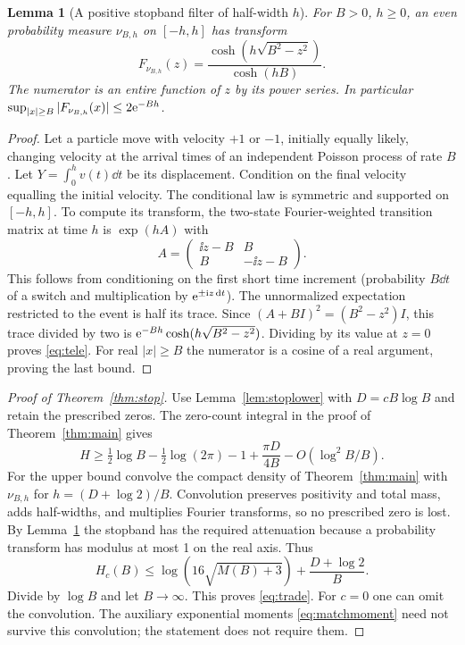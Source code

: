 \documentclass[11pt]{article}
\newtheorem{lemma}[theorem]{Lemma}
\theoremstyle{remark}\newtheorem{remark}[theorem]{Remark}
\begin{document}
\begin{lemma}[A positive stopband filter of half-width $h$]\label{lem:tele}
For $B>0$, $h\ge0$, an even probability measure $\nu_{B,h}$ on $[-h,h]$ has transform
\begin{equation}\label{eq:tele}
F_{\nu_{B,h}}(z)=\frac{\cosh(h\sqrt{B^2-z^2})}{\cosh(hB)}.
\end{equation}
The numerator is an entire function of $z$ by its power series. In particular $\sup_{|x|\ge B}|F_{\nu_{B,h}}(x)|\le 2\mathrm e^{-Bh}$.
\end{lemma}
\begin{proof}
Let a particle move with velocity $+1$ or $-1$, initially equally likely, changing velocity at the arrival times of an independent Poisson process of rate $B$. Let $Y=\int_0^h v(t)\dd t$ be its displacement. Condition on the final velocity equalling the initial velocity. The conditional law is symmetric and supported on $[-h,h]$. To compute its transform, the two-state Fourier-weighted transition matrix at time $h$ is $\exp(hA)$ with
\[
A=\begin{pmatrix}\ii z-B&B\\B&-\ii z-B\end{pmatrix}.
\]
This follows from conditioning on the first short time increment (probability $B\dd t$ of a switch and multiplication by $\mathrm e^{\pm\mathrm i z\,\mathrm d t}$). The unnormalized expectation restricted to the event is half its trace. Since $(A+BI)^2=(B^2-z^2)I$, this trace divided by two is $\mathrm e^{-Bh}\cosh(h\sqrt{B^2-z^2})$. Dividing by its value at $z=0$ proves \eqref{eq:tele}. For real $|x|\ge B$ the numerator is a cosine of a real argument, proving the last bound.
\end{proof}

\begin{proof}[Proof of Theorem~\ref{thm:stop}]
Use Lemma~\ref{lem:stoplower} with $D=cB\log B$ and retain the prescribed zeros. The zero-count integral in the proof of Theorem~\ref{thm:main} gives
\[
H\ge\tfrac12\log B-\tfrac12\log(2\pi)-1+\frac{\pi D}{4B}-O(\log^2 B/B).
\]
For the upper bound convolve the compact density of Theorem~\ref{thm:main} with $\nu_{B,h}$ for $h=(D+\log2)/B$. Convolution preserves positivity and total mass, adds half-widths, and multiplies Fourier transforms, so no prescribed zero is lost. By Lemma~\ref{lem:tele} the stopband has the required attenuation because a probability transform has modulus at most 1 on the real axis. Thus
\[
H_c(B)\le\log(16\sqrt{M(B)+3})+\frac{D+\log2}{B}.
\]
Divide by $\log B$ and let $B\to\infty$. This proves \eqref{eq:trade}. For $c=0$ one can omit the convolution. The auxiliary exponential moments \eqref{eq:matchmoment} need not survive this convolution; the statement does not require them.
\end{proof}
\end{document}
